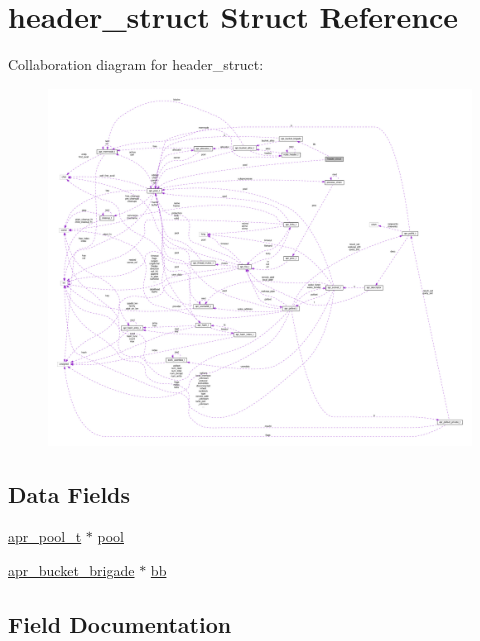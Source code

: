 \hypertarget{structheader__struct}{}\section{header\+\_\+struct Struct Reference}
\label{structheader__struct}


Collaboration diagram for header\+\_\+struct\+:
\nopagebreak
\begin{figure}[H]
\begin{center}
\leavevmode
\includegraphics[width=350pt]{structheader__struct__coll__graph}
\end{center}
\end{figure}
\subsection*{Data Fields}
\begin{DoxyCompactItemize}
\item 
\hyperlink{structapr__pool__t}{apr\+\_\+pool\+\_\+t} $\ast$ \hyperlink{structheader__struct_a2c74583f4c50090dee7deb9532ebc7ae}{pool}
\item 
\hyperlink{structapr__bucket__brigade}{apr\+\_\+bucket\+\_\+brigade} $\ast$ \hyperlink{structheader__struct_a00e057ecfd8743af3d991d1f2e1a3d11}{bb}
\end{DoxyCompactItemize}


\subsection{Field Documentation}
